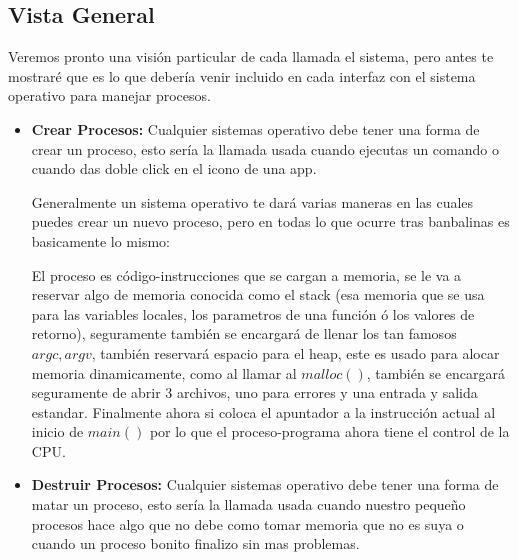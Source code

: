 \documentclass[12pt, fleqn]{report}                             %
\begin{document}
            \subsection{Vista General}

                Veremos pronto una visión particular de cada llamada el sistema, pero 
                antes te mostraré que es lo que debería venir incluido en cada interfaz
                con el sistema operativo para manejar procesos.

                \begin{itemize}
                    \item
                        \textbf{Crear Procesos:}
                        Cualquier sistemas operativo debe tener una 
                        forma de crear un proceso, esto sería la llamada usada
                        cuando ejecutas un comando o cuando das doble click en el icono
                        de una app.

                        Generalmente un sistema operativo te dará varias maneras en 
                        las cuales puedes crear un nuevo proceso, pero en todas lo
                        que ocurre tras banbalinas es basicamente lo mismo:

                        El proceso es código-instrucciones que se cargan a memoria,
                        se le va a reservar algo de memoria conocida como el stack 
                        (esa memoria que se usa para las variables locales, los 
                        parametros de una función ó los valores de retorno), seguramente
                        también se encargará de llenar los tan famosos $argc, argv$,
                        también reservará espacio para el heap, este es usado
                        para alocar memoria dinamicamente, como al llamar al $malloc()$,
                        también se encargará seguramente de abrir 3 archivos, uno para
                        errores y una entrada y salida estandar. Finalmente ahora si
                        coloca el apuntador a la instrucción actual al inicio de $main()$
                        por lo que el proceso-programa ahora tiene el control de la CPU.

                    \item
                        \textbf{Destruir Procesos:}
                        Cualquier sistemas operativo debe tener una 
                        forma de matar un proceso, esto sería la llamada usada
                        cuando nuestro pequeño procesos hace algo que no debe como
                        tomar memoria que no es suya o cuando un proceso bonito finalizo
                        sin mas problemas.


\end{itemize}
\end{document}
